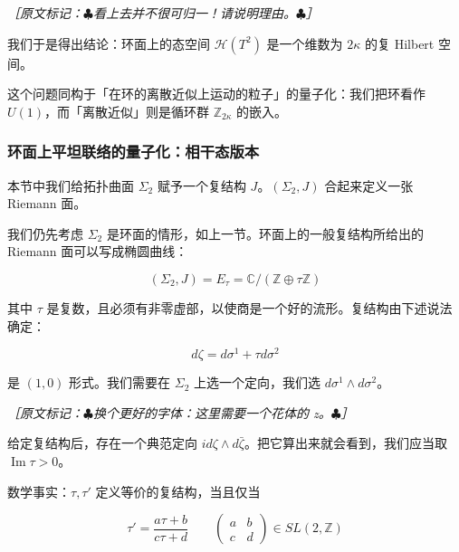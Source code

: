 {\small\itshape ［原文标记：$\clubsuit$看上去并不很可归一！请说明理由。$\clubsuit$］}

我们于是得出结论：环面上的态空间 $\mathcal{H}(T^2)$ 是一个维数为 $2\kappa$ 的复 Hilbert 空间。

这个问题同构于「在环的离散近似上运动的粒子」的量子化：我们把环看作 $U(1)$，而「离散近似」则是循环群 $\mathbb{Z}_{2\kappa}$ 的嵌入。

\subsubsection{环面上平坦联络的量子化：相干态版本} %

本节中我们给拓扑曲面 $\Sigma_2$ 赋予一个复结构 $J$。$(\Sigma_2,J)$ 合起来定义一张 Riemann 面。

我们仍先考虑 $\Sigma_2$ 是环面的情形，如上一节。环面上的一般复结构所给出的 Riemann 面可以写成椭圆曲线：

\begin{equation}
  (\Sigma_2,J)=E_\tau=\mathbb{C}/(\mathbb{Z}\oplus\tau\mathbb{Z})
  \tag{2.149}
  \label{eq:2.149}
\end{equation}

其中 $\tau$ 是复数，且必须有非零虚部，以使商是一个好的流形。复结构由下述说法确定：

\begin{equation}
  d\zeta=d\sigma^1+\tau d\sigma^2
  \tag{2.150}
  \label{eq:2.150}
\end{equation}

是 $(1,0)$ 形式。我们需要在 $\Sigma_2$ 上选一个定向，我们选 $d\sigma^1\wedge d\sigma^2$。

{\small\itshape ［原文标记：$\clubsuit$换个更好的字体：这里需要一个花体的 z。$\clubsuit$］}

给定复结构后，存在一个典范定向 $id\zeta\wedge d\bar\zeta$。把它算出来就会看到，我们应当取 $\operatorname{Im}\tau>0$。

数学事实：$\tau,\tau'$ 定义等价的复结构，当且仅当

\begin{equation}
  \tau'=\frac{a\tau+b}{c\tau+d} \qquad
  \begin{pmatrix}a & b\\ c & d\end{pmatrix}\in SL(2,\mathbb{Z})
  \tag{2.151}
  \label{eq:2.151}
\end{equation}


